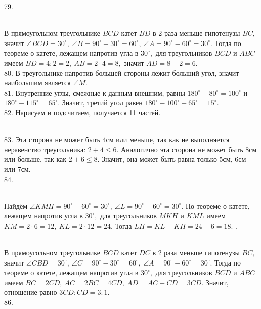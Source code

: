 79. \begin{figure}[ht!]
\end{figure}\\
В прямоугольном треугольнике $BCD$ катет $BD$ в 2 раза меньше гипотенузы $BC,$ значит $\angle BCD=30^\circ,\ \angle B=90^\circ-30^\circ=60^\circ,\ \angle A=90^\circ-60^\circ=30^\circ.$ Тогда по теореме о катете, лежащем напротив угла в $30^\circ,$ для треугольников $BCD$ и $ABC$ имеем $BD=4:2=2,\ AB=2\cdot4=8,$ значит  $AD=8-2=6.$\\
80. В треугольнике напротив большей стороны лежит больший угол, значит наибольшим является $\angle M.$\\
81. Внутренние углы, смежные к данным внешним, равны $180^\circ-80^\circ=100^\circ$ и $180^\circ-115^\circ=65^\circ.$ Значит, третий угол равен $180^\circ-100^\circ-65^\circ=15^\circ.$\\
82. Нарисуем и подсчитаем, получается 11 частей.
\begin{figure}[ht!]
\end{figure}\\
83. Эта сторона не может быть 4см или меньше, так как не выполняется неравенство треугольника: $2+4\leqslant6.$ Аналогично эта сторона не может быть 8см или больше, так как $2+6\leqslant8.$ Значит, она может быть равна только 5см, 6см или 7см.\\
84. \begin{figure}[ht!]
\end{figure}\\
Найдём $\angle KMH=90^\circ-60^\circ=30^\circ,\ \angle L=90^\circ-60^\circ=30^\circ.$ По теореме о катете, лежащем напротив угла в $30^\circ,$ для треугольников $MKH$ и $KML$ имеем $KM=2\cdot6=12,\ KL=2\cdot12=24.$ Тогда $LH=KL-KH=24-6=18.$\newpage
{}. \begin{figure}[ht!]
\end{figure}\\
В прямоугольном треугольнике $BCD$ катет $DC$ в 2 раза меньше гипотенузы $BC,$ значит $\angle CBD=30^\circ,\ \angle C=90^\circ-30^\circ=60^\circ,\ \angle A=90^\circ-60^\circ=30^\circ.$ Тогда по теореме о катете, лежащем напротив угла в $30^\circ,$ для треугольников $BCD$ и $ABC$ имеем $BC=2CD,\ AC=2BC=4CD,\ AD=AC-CD=3CD.$ Значит, отношение равно $3CD:CD=3:1.$\\
86. \begin{figure}[ht!]
\end{figure}\\
